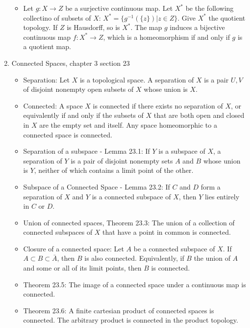 \documentclass[12pt,letterpaper]{article}
\begin{document}
\begin{enumerate}
\begin{itemize}
    \item \label{thm:HausdorffHomeomorphismQuotientMap} Let $g: X\rightarrow Z$ be a surjective continuous map. Let $X^*$ be the following collectino of subsets of $X$: $X^*=\{g^{-1}(\{z\}) | z\in Z\}$. Give $X^*$ the quotient topology. If $Z$ is Hausdorff, so is $X^*$. The map $g$ induces a bijective continuous map $f: X^*\rightarrow Z$, which is a homeomorphism if and only if $g$ is a quotient map.
  \end{itemize}
  \item \label{sec:connectedness} Connected Spaces, chapter 3 section 23
  \begin{itemize}
    \item \label{dfn:separation} Separation: Let $X$ is a topological space. A separation of $X$ is a pair $U,V$ of disjoint nonempty open subsets of $X$ whose union is $X$.
    \item \label{dfn:connected} Connected: A space $X$ is connected if there exists no separation of $X$, or equivalently if and only if the subsets of $X$ that are both open and closed in $X$ are the empty set and itself. Any space homeomorphic to a connected space is connected.
    \item \label{dfn:subspaceSeparation} Separation of a subspace - Lemma 23.1: If $Y$ is a subspace of $X$, a separation of $Y$ is a pair of disjoint nonempty sets $A$ and $B$ whose union is $Y$, neither of which contains a limit point of the other.
    \item \label{thm:subspaceOfConnected} Subspace of a Connected Space - Lemma 23.2: If $C$ and $D$ form a separation of $X$ and $Y$ is a connected subspace of $X$, then $Y$ lies entirely in $C$ or $D$.
    \item \label{thm:unionConnected} Union of connected spaces, Theorem 23.3: The union of a collection of connected subspaces of $X$ that have a point in common is connected.
    \item \label{thm:closureConnected} Closure of a connected space: Let $A$ be a connected subspace of $X$. If $A\subset B\subset \bar{A}$, then $B$ is also connected. Equivalently, if $B$ the union of $A$ and some or all of its limit points, then $B$ is connected.
    \item \label{thm:continuousConnected} Theorem 23.5: The image of a connected space under a continuous map is connected.
    \item \label{thm:finiteCartesianConnected} Theorem 23.6: A finite cartesian product of connected spaces is connected. The arbitrary product is connected in the product topology.
  \end{itemize}
\end{enumerate}
\end{document}
